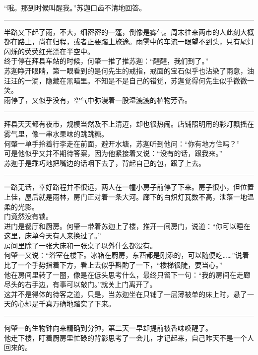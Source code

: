 \documentclass[oneside,11pt]{memoir} %
\begin{document}
\begin{CJK}{UTF8}{gbsn}
    “哦。那到时候叫醒我。”苏迦口齿不清地回答。\\\indent
\rule{-3pt}{30pt}
    半路又下起了雨，不大，细密密的一蓬，倒像是雾气。周末往来两市的人此刻大概都在路上，尚在归程，或者正要踏上旅途。雨雾中的车流一眼望不到头，只有尾灯闪烁的荧荧红光漂在半空中。\\\indent
    终于停在拜县车站的时候，何肇一推了推苏迦：“醒醒，我们到了。”\\\indent
    苏迦睁开眼睛，第一眼看到的是何先生的戒指，戒面的宝石似乎也沾染了雨意，油汪汪的一滴，隐藏在黑暗里。不知是不是自己的错觉，苏迦觉得何先生似乎微微一笑。\\\indent
    雨停了，又似乎没有，空气中弥漫着一股湿漉漉的植物芳香。\\\indent
\rule{-3pt}{30pt}
    拜县天天都有夜市，规模当然及不上清迈，却也很热闹。店铺照明用的彩灯飘摇在雾气里，像一串水果味的跳跳糖。\\\indent
    何肇一单手拎着行李走在前面，避开水塘，苏迦听到他问：“你有地方住吗？”\\\indent
    可是他似乎又并不期待答案，因为他紧接着又说：“没有的话，跟我来。”\\\indent
    苏迦于是乖巧地把嘴边的话咽下去了，背起自己的包，跟了上去。\\\indent
\rule{-3pt}{30pt}
    一路无话，幸好路程并不很远，两人在一幢小房子前停了下来。房子很小，但位置上佳，屋后就是雨林，房门正对着一条大河。廊下的白炽灯瓦数不高，泄落一地温柔的光影。\\\indent
    门竟然没有锁。\\\indent
    进门是餐厅和厨房。何肇一带着苏迦上了楼，推开一间房门，说道：“你可以睡在这里，床单今天有人来换过了。”\\\indent
    房间里除了一张大床和一张桌子以外什么都没有。\\\indent
    何肇一又说：“浴室在楼下。冰箱在厨房，东西都是刚添的，可以随便吃……”说着比了一个手势指着下方，看上去似乎斟酌了一下，“楼梯很陡，要当心。”\\\indent
    他在房间里转了一圈，像是在低头思考什么，最终只留下一句：“我的房间在走廊尽头的右手边，有事可以敲门。”就关上门离开了。\\\indent
    这并不是得体的待客之道，只是，当苏迦坐在只铺了一层薄被单的床上时，悬了一天的心却是千真万确地踏实了下来。\\\indent
\rule{-3pt}{30pt}
    何肇一的生物钟向来精确到分钟，第二天一早却提前被香味唤醒了。\\\indent
    他走下楼，盯着厨房里忙碌的背影思考了一会儿，才记起来，自己昨天不是一个人回来的。\\\indent

\end{CJK}
\end{document}
